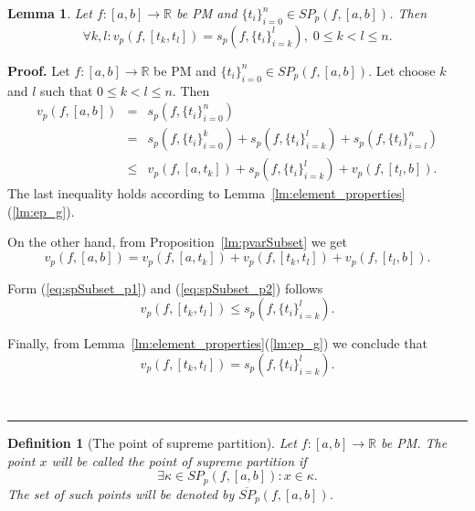 \documentclass[12pt, a4paper]{article}
\newtheorem{lemma}[theorem]{Lemma}
\newtheorem{definition}[theorem]{Definition}
\newenvironment{proof}[1][Proof]{\noindent \textbf{#1.} }{\  \rule{0.5em}{0.5em}}
\numberwithin{equation}{section}
\begin{document}
\begin{lemma}\label{lm:spSubset}
  Let $f:[a,b] \rightarrow \mathbb{R}$ be PM 
  and $\{t_i\}_{i=0}^{n} \in SP_{p}(f,[a,b])$. Then
  \begin{equation}
    \forall k,l: v_p(f,[t_k, t_l]) = 
      s_p\left(f,\{t_i\}_{i=k}^{l}\right) ,\; 0 \leq k<l\leq n. 
  \end{equation}
\end{lemma}
\begin{proof}
  Let $f:[a,b] \rightarrow \mathbb{R}$ be PM 
  and $\{t_i\}_{i=0}^{n} \in SP_{p}(f,[a,b])$. 
  Let choose $k$ and $l$ such that $0\leq k<l\leq n$.
  Then 
  \begin{eqnarray}
    v_p(f, [a, b]) & = & s_p(f,\{t_i\}_{i=0}^{n}) \\
    & = & s_p(f,\{t_i\}_{i=0}^{k})+s_p(f,\{t_i\}_{i=k}^{l})
      +s_p(f,\{t_i\}_{i=l}^{n})\\
    \label{eq:spSubset_p1}  
    & \leq & v_p(f, [a,t_k]) + s_p(f,\{t_i\}_{i=k}^{l})
      +v_p(f, [t_l, b]).         
  \end{eqnarray}    
  The last inequality holds according to 
  Lemma~\ref{lm:element_properties}(\ref{lm:ep_g}).  
    
  On the other hand, from Proposition~\ref{lm:pvarSubset}
  we get
  \begin{equation}\label{eq:spSubset_p2}  
    v_p(f, [a, b]) = 
      v_p(f, [a,t_k]) + v_p(f,[t_k, t_l])
      +v_p(f, [t_l, b]).     
  \end{equation}      
  
  Form (\ref{eq:spSubset_p1}) and (\ref{eq:spSubset_p2})
  follows 
  \begin{equation} 
    v_p(f,[t_k, t_l]) \leq s_p(f,\{t_i\}_{i=k}^{l}).  
  \end{equation} 
  
  Finally, from Lemma~\ref{lm:element_properties}(\ref{lm:ep_g})
  we conclude that 
  \begin{equation} 
    v_p(f,[t_k, t_l]) = s_p(f,\{t_i\}_{i=k}^{l}).  
  \end{equation}   
  
\end{proof}


\begin{definition}[The point of supreme partition]\label{def:psp}
  Let $f:[a,b] \rightarrow \mathbb{R}$ be PM.  
  The point $x$ will be called the \emph{point of supreme partition}
  if 
  \begin{equation}
    \exists \kappa \in SP_p(f, [a,b]): x \in \kappa.
  \end{equation} 
  The set of such points will be denoted by 
  $\overline{SP}_p(f, [a, b])$.
\end{definition}
\end{document}
